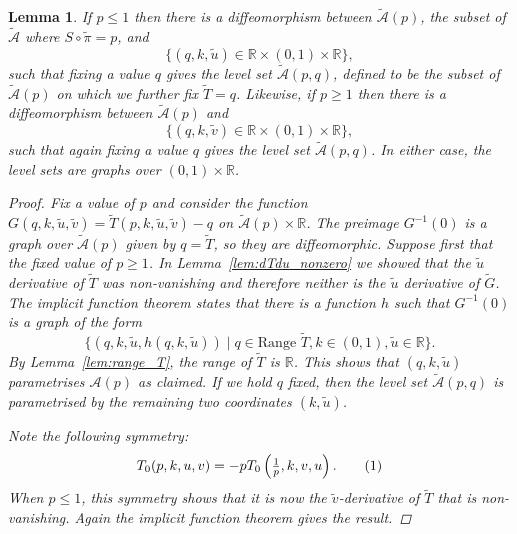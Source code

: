 \documentclass{article}
\numberwithin{equation}{section}
\numberwithin{figure}{section}
\newtheorem{lem}[equation]{Lemma}
\newcommand{\labelthis}[1]{\addtocounter{equation}{1}\tag{\theequation}\label{#1}}
\newcommand{\bra}[1]{\left(#1\right)}
\newcommand{\R}{\mathbb{R}}
\begin{document}
\begin{lem}\label{lem:T_graph}
If $p \leq 1$ then there is a diffeomorphism between $\mathcal{\tilde{A}}(p)$, the subset of $\mathcal{\tilde{A}}$ where $S\circ \tilde{\pi} = p$, and
\[
\{(q,k,\tilde{u}) \in \R\times(0,1)\times\R \},
\]
such that fixing a value $q$ gives the level set $\mathcal{\tilde{A}}(p,q)$, defined to be the subset of $\mathcal{\tilde{A}}(p)$ on which we further fix $\tilde{T} = q$. Likewise, if $p \geq 1$ then there is a diffeomorphism between $\tilde{\mathcal{A}}(p)$ and
\[
\{(q,k,\tilde{v}) \in \R\times(0,1)\times\R \},
\]
such that again fixing a value $q$ gives the level set $\mathcal{\tilde{A}}(p,q)$.
In either case, the level sets are graphs over $(0,1)\times \R$.

\begin{proof}
Fix a value of $p$ and consider the function $G(q, k,\tilde{u},\tilde{v}) = \tilde{T}(p,k,\tilde{u},\tilde{v}) - q$ on $\mathcal{\tilde{A}}(p)\times\R$. The preimage $G^{-1}(0)$ is a graph over $\mathcal{\tilde{A}}(p)$ given by $q=\tilde{T}$, so they are diffeomorphic. 
Suppose first that the fixed value of $p\geq 1$. In Lemma~\ref{lem:dTdu_nonzero} we showed that the $\tilde{u}$ derivative of $\tilde{T}$ was non-vanishing and therefore neither is the $\tilde{u}$ derivative of $\tilde{G}$. The implicit function theorem states that there is a function $h$ such that $G^{-1}(0)$ is a graph of the form
\[
\{ (q, k, \tilde{u}, h(q,k,\tilde{u})) \mid q \in \text{Range } \tilde{T}, k \in (0,1), \tilde{u}\in\R \}. 
\]
By Lemma~\ref{lem:range_T}, the range of $\tilde{T}$ is $\R$. This shows that $(q,k,\tilde{u})$ parametrises $\mathcal{A}(p)$ as claimed. If we hold $q$ fixed, then the level set $\mathcal{\tilde{A}}(p,q)$ is parametrised by the remaining two coordinates $(k,\tilde{u})$.

Note the following symmetry:
\begin{align*}
T_0(p,k,u,v) = -p T_0\bra{ \tfrac{1}{p}, k, v, u }.
\labelthis{eqn:T_0 symmetry}
\end{align*}
When $p\leq 1$, this symmetry shows that it is now the $\tilde{v}$-derivative of $\tilde{T}$ that is non-vanishing. Again the implicit function theorem gives the result.
\end{proof}
\end{lem}
\end{document}
